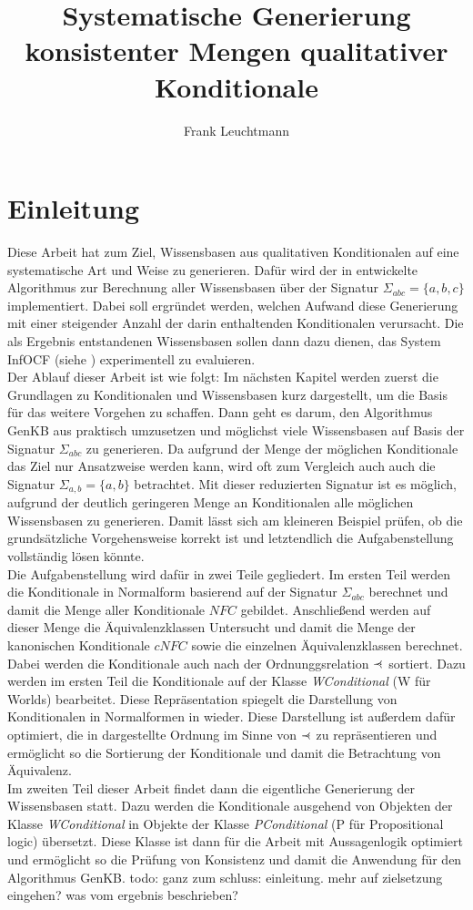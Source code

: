 \documentclass[12pt,a4paper]{article}
\author{Frank Leuchtmann}
\title{Systematische Generierung konsistenter Mengen qualitativer
Konditionale}
\newcommand\rdotl{\mathrel{%
    \mathchoice{\RQEQ}{\RQEQ}{\RQEQ}{\RQEQ}%
}}
\def\RQEQ{{%
    \setbox0\hbox{$\prec$}%
    \rlap{\hbox to \wd0{\hss \raisebox {0.01pt}{$\ \cdot$\hss}}}\box0
}}
\begin{document}
\maketitle
\newpage
\tableofcontents
\newpage
\section{Einleitung}
Diese Arbeit hat zum Ziel, Wissensbasen aus qualitativen Konditionalen auf eine systematische Art und Weise zu generieren. Dafür wird der in \cite{beierle19} entwickelte Algorithmus zur Berechnung aller Wissensbasen über der Signatur $\Sigma_{abc}= \{a,b,c\}$ implementiert. Dabei soll ergründet werden, welchen Aufwand diese Generierung mit einer steigender Anzahl der darin  enthaltenden Konditionalen verursacht. Die als Ergebnis entstandenen Wissensbasen sollen dann dazu dienen, das System InfOCF (siehe \cite{beierle17}) experimentell zu evaluieren. \\
Der Ablauf dieser Arbeit ist wie folgt: Im nächsten Kapitel werden zuerst die Grundlagen zu Konditionalen und Wissensbasen kurz dargestellt, um die Basis für das weitere Vorgehen zu schaffen. Dann geht es darum, den Algorithmus GenKB aus \cite{beierle19} praktisch umzusetzen und möglichst viele Wissensbasen auf Basis der Signatur $\Sigma_{abc}$ zu generieren. Da aufgrund der Menge der möglichen Konditionale das Ziel nur Ansatzweise werden kann, wird oft zum Vergleich auch auch die Signatur $\Sigma_{a,b} = \{a,b\}$ betrachtet. Mit dieser reduzierten Signatur ist es möglich, aufgrund der deutlich geringeren Menge an Konditionalen alle möglichen Wissensbasen zu generieren. Damit lässt sich am kleineren Beispiel prüfen, ob die grundsätzliche Vorgehensweise korrekt ist und letztendlich die Aufgabenstellung vollständig lösen könnte. \\
Die Aufgabenstellung wird dafür in zwei Teile gegliedert. Im ersten Teil werden die Konditionale in Normalform basierend auf der Signatur $\Sigma_{abc}$ berechnet und damit die Menge aller Konditionale $NFC$ gebildet. Anschließend werden auf dieser Menge die Äquivalenzklassen Untersucht und damit die Menge der kanonischen Konditionale $cNFC$ sowie die einzelnen Äquivalenzklassen berechnet. Dabei werden die Konditionale auch nach der Ordnunggsrelation $\rdotl$ sortiert. Dazu werden im ersten Teil die Konditionale auf der Klasse \textit{WConditional} (W für Worlds) bearbeitet. Diese Repräsentation spiegelt die Darstellung von Konditionalen in Normalformen in \cite{beierle19} wieder. Diese Darstellung ist außerdem dafür optimiert, die in \cite{beierle19} dargestellte Ordnung im Sinne von $\rdotl$ zu repräsentieren und ermöglicht so die Sortierung der Konditionale und damit die Betrachtung von Äquivalenz. \\
Im zweiten Teil dieser Arbeit findet dann die eigentliche Generierung der Wissensbasen statt. Dazu werden die Konditionale ausgehend von Objekten der Klasse \textit{WConditional} in Objekte der Klasse \textit{PConditional} (P für Propositional logic) übersetzt. Diese Klasse ist dann für die Arbeit mit Aussagenlogik optimiert und ermöglicht so die Prüfung von Konsistenz und damit die Anwendung für den Algorithmus GenKB.
todo: ganz zum schluss: einleitung. mehr auf zielsetzung eingehen? was vom ergebnis beschrieben?
\end{document}
